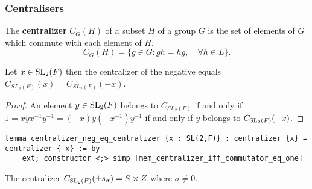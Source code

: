 
\subsubsection{Centralisers}

\begin{definition}[Centralizer]
The \textbf{centralizer} $C_G(H)$ of a subset $H$ of a group $G$ is the set of elements of $G$ which commute with each element of $H$.
\begin{equation*} 
    C_G(H) = \{ g \in G  : gh=hg, \quad \forall h\in L \}. \end{equation*} 
\end{definition}

\begin{corollary}
    \label{centralizer_neg_eq_centralizer}
    \leanok
    Let $x \in \operatorname{SL}_2(F)$ then the centralizer of the negative equals $C_{SL_2(F)}(x) = C_{SL_2(F)}(-x)$.
\end{corollary}
\begin{proof}
    \leanok
 An element $y \in \operatorname{SL}_2(F)$ belongs to $C_{SL_2(F)}$ if and only if
  $1 = x y x^{-1} y^{-1} = (-x) y (-x^{-1}) y^{-1}$  if and only if $y$ belongs to $C_{\operatorname{SL}_2(F)}(-x)$.
\end{proof}
\begin{footnotesize}
\begin{verbatim}
lemma centralizer_neg_eq_centralizer {x : SL(2,F)} : centralizer {x} = centralizer {-x} := by
    ext; constructor <;> simp [mem_centralizer_iff_commutator_eq_one]
\end{verbatim}
\end{footnotesize}
    

\begin{proposition}
\label{centralizer_s_eq_SZ}
\leanok
The centralizer $C_{\operatorname{SL}_2(F)}(\pm s_\sigma) =  S \times Z $ where $\sigma \neq 0$.
\end{proposition}

